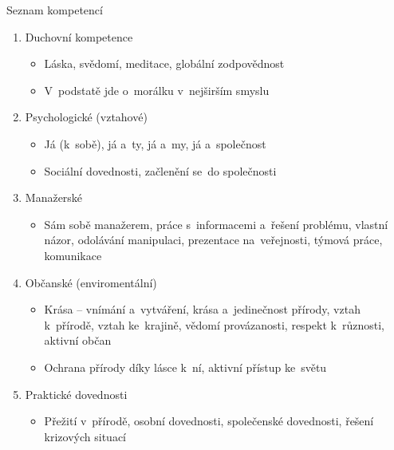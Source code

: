 \documentclass[compress, ucs, xelatex, 11pt, xcolor=dvipsnames, print, aspectratio=169,
	hyperref={
		bookmarks=true,
		unicode=true,
		colorlinks=true,
		pdftitle={Skautska vychovna metoda},
		plainpages=false,
		pdfauthor={Vojtech Zeisek},
		pdfsubject={Skautska vychovna metoda a jeji vyvoj za posledni stoleti a desetileti},
		pdfcreator={XeLaTeX},
		pdfkeywords={Junak, Pedagogika, Skaut, Skauting, Vychovna metoda},
		linkcolor=Red, %
		anchorcolor=ForestGreen, %
		citecolor=ForestGreen, %
		filecolor=ForestGreen, %
		menucolor=ForestGreen, %
		urlcolor=Sepia, %
		pdftex},
	url={hyphens, lowtilde} %
	]{beamer}
\begin{document}
\begin{frame}{Seznam kompetencí}
	\begin{enumerate}
		\item Duchovní kompetence
		\begin{itemize}
			\item Láska, svědomí, meditace, globální zodpovědnost
			\item V~podstatě jde o~morálku v~nejširším smyslu
		\end{itemize}
			\item Psychologické (vztahové)
		\begin{itemize}
			\item Já (k~sobě), já a~ty, já a~my, já a~společnost
			\item Sociální dovednosti, začlenění se~do společnosti
		\end{itemize}
		\item Manažerské
		\begin{itemize}
			\item Sám sobě manažerem, práce s~informacemi a~řešení problému, vlastní názor, odolávání manipulaci, prezentace na~veřejnosti, týmová práce, komunikace
		\end{itemize}
		\item Občanské (enviromentální)
		\begin{itemize}
			\item Krása -- vnímání a~vytváření, krása a~jedinečnost přírody, vztah k~přírodě, vztah ke~krajině, vědomí provázanosti, respekt k~různosti, aktivní občan
			\item Ochrana přírody díky lásce k~ní, aktivní přístup ke~světu
		\end{itemize}
		\item Praktické dovednosti
		\begin{itemize}
			\item Přežití v~přírodě, osobní dovednosti, společenské dovednosti, řešení krizových situací
		\end{itemize}
	\end{enumerate}
\end{frame}
\end{document}
